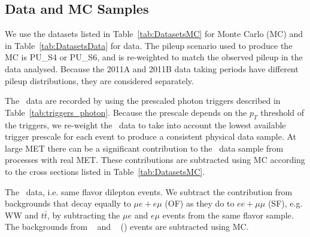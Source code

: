 \subsection{Data and MC Samples}

We use the datasets listed in Table~\ref{tab:DatasetsMC} for Monte Carlo (MC) and in Table~\ref{tab:DatasetsData} for data.
The pileup scenario used to produce the MC is PU\_S4 or PU\_S6, and is re-weighted
to match the observed pileup in the data analysed.
Because the 2011A and 2011B data taking periods have different pileup distributions,
they are considered separately.

The \gjets~data are recorded by using the prescaled photon triggers described in Table~\ref{tab:triggers_photon}.
Because the prescale depends on the $p_T$ threshold of the triggers, we re-weight the \gjets~data to take into
account the lowest available trigger prescale for each event to produce a consistent physical data sample.
At large MET there can be a significant contribution to the \gjets~data sample from processes with real MET.
These contributions are subtracted using MC according to the cross sections listed in Table~\ref{tab:DatasetsMC}.

The \dyll~data, i.e. same flavor dilepton events.  
We subtract the contribution from backgrounds that decay equally to $\mu e+e\mu$ (OF) as they do to $ee+\mu\mu$ (SF),
e.g. $\mathrm{WW}$ and $t\bar{t}$, by subtracting the $\mu e$ and $e\mu$ events from the same flavor sample.
The backgrounds from \W\Z~ and \Z\Z~ (\V\Z) events are subtracted using MC.

